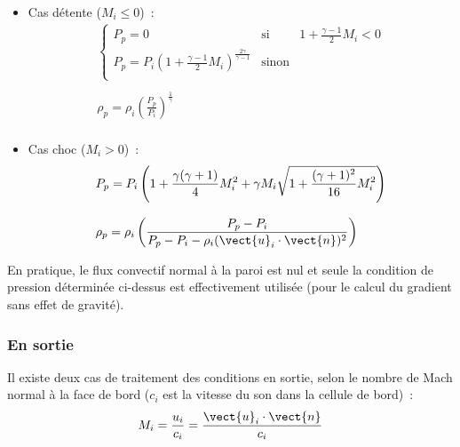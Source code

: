 \begin{enumerate}
\begin{itemize}
\item Cas détente ($M_i \leqslant 0$)~:\\
$$
\begin{array}{l}
\left\{\begin{array}{lll}
P_p=0 & \text{si} & 1 + \displaystyle\frac{\gamma-1}{2}M_i<0\\
P_p = P_i \left(1 + \displaystyle\frac{\gamma-1}{2}M_i\right)
^{\frac{2\gamma}{\gamma-1}} & \text{sinon}\\
\end{array}\right.\\
\\
\rho_p=\rho_i \left(\displaystyle\frac{P_p}{P_i}\right)^{\frac{1}{\gamma}}\\
\end{array}
$$

\item Cas choc ($M_i > 0$)~:\\
$$
\begin{array}{l}
P_p = P_i \left(1 + \displaystyle\frac{\gamma(\gamma+1)}{4}M_i^2
+\gamma M_i \displaystyle\sqrt{1+\displaystyle\frac{(\gamma+1)^2}{16}M_i^2}\right)
\\
\\
\rho_p=\rho_i \left(\displaystyle\frac{P_p-P_i}
{P_p-P_i-\rho_i (\vect{u}_i \cdot \vect{n})^2}\right)\\
\end{array}
$$

\end{itemize}

\end{enumerate}

En pratique, le flux convectif normal à la paroi est nul et seule
la condition de pression déterminée ci-dessus est effectivement
utilisée (pour le calcul du gradient sans effet de gravité).

\subsubsection*{En sortie}

Il existe deux cas de traitement des conditions en sortie,
selon le nombre de Mach normal à la face de bord
($c_i$ est la vitesse du son dans la cellule de bord)~:
$$M_i = \displaystyle\frac{u_i}{c_i}
= \displaystyle\frac{\vect{u}_i \cdot \vect{n}}{c_i}$$

